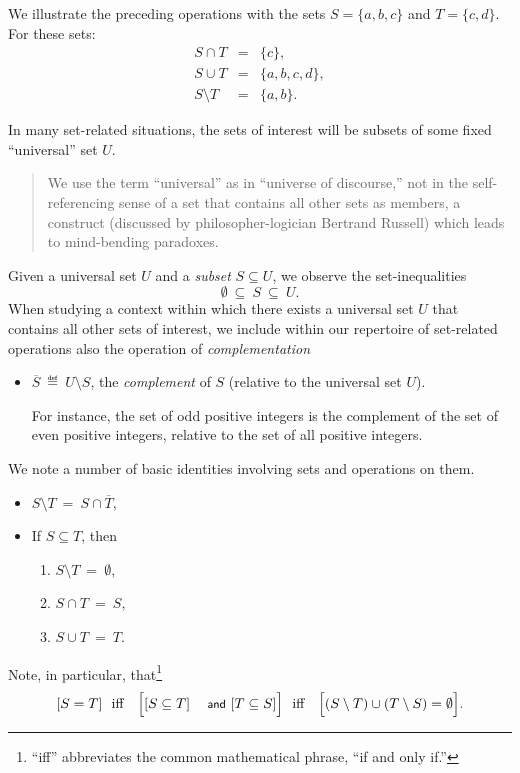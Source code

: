 We illustrate the preceding operations with the sets $S = \{a,b,c\}$
and $T = \{c,d\}$.  For these sets:
\begin{eqnarray*}
S \cap T & = &  \{c\}, \\
S \cup T & = & \{a,b,c,d\}, \\
S \setminus T & = & \{a,b\}.
\end{eqnarray*}

In many set-related situations, the sets of interest will be subsets
of some fixed ``universal'' set $U$.
\begin{quote}
We use the term ``universal'' as in ``universe of discourse,'' not in
the self-referencing sense of a set that contains all other sets as
members, a construct (discussed by philosopher-logician Bertrand
Russell)  which leads to mind-bending paradoxes.
\end{quote}
Given a universal set $U$ and a {\em subset} $S \subseteq U$,
we observe the set-inequalities
\[ \emptyset \ \subseteq \ S \ \subseteq \ U. \]
When studying a context within which there exists a universal set $U$
that contains all other sets of interest, we include within our
repertoire of set-related operations also the operation of {\it
  complementation}
\begin{itemize}
\item
$\overline{S} \ \eqdef \ U \setminus S$,
the {\em complement} of $S$ (relative to the universal set $U$).

For instance, the set of odd positive integers is the complement of
the set of even positive integers, relative to the set of all positive
integers.
\end{itemize}
We note a number of basic identities involving sets and operations on
them.
\begin{itemize}
\item
$S \setminus T \ = \ S \cap \overline{T}$,
\item
If $S \subseteq T$, then
  \begin{enumerate}
  \item
$S \setminus T \ = \ \emptyset$,
  \item
$S \cap T \ = \ S$,
  \item
$S \cup T \ = \ T$.
  \end{enumerate}
\end{itemize}
Note, in particular, that\footnote{``iff'' abbreviates the common
mathematical phrase, ``if and only if.''}
\[ [S = T] \ \mbox{  iff  } \ \ \Bigl[[S \subseteq T] \mbox{
    {\small\sf and} } [T \subseteq S]\Bigr] \ \mbox{  iff  }
\ \ \Bigl[ (S \setminus T) \cup (T \setminus S) = \emptyset\Bigr].
\]

